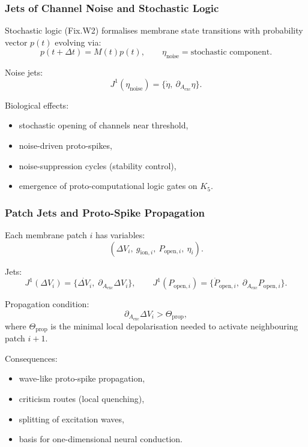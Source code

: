 \subsubsection{Jets of Channel Noise and Stochastic Logic}

Stochastic logic (Fix.W2) formalises membrane state transitions with
probability vector $p(t)$ evolving via:
\[
p(t+\Delta t)=M(t)p(t),\qquad
\eta_{\mathrm{noise}}=\text{stochastic component}.
\]

Noise jets:
\[
J^1(\eta_{\mathrm{noise}})=
\{\dot{\eta},\ \partial_{A_{\mathrm{exc}}}\eta\}.
\]

Biological effects:

\begin{itemize}
    \item stochastic opening of channels near threshold,
    \item noise-driven proto-spikes,
    \item noise-suppression cycles (stability control),
    \item emergence of proto-computational logic gates on $K_5$.
\end{itemize}


\subsubsection{Patch Jets and Proto-Spike Propagation}

Each membrane patch $i$ has variables:
\[
(\Delta V_i,\ g_{\mathrm{ion},i},\ P_{\mathrm{open},i},\ \eta_i).
\]

Jets:
\[
J^1(\Delta V_i)=\{\dot{\Delta V_i},\;\partial_{A_{\mathrm{exc}}}\Delta V_i\},
\qquad
J^1(P_{\mathrm{open},i})=\{\dot{P}_{\mathrm{open},i},\;
\partial_{A_{\mathrm{exc}}}P_{\mathrm{open},i}\}.
\]

Propagation condition:
\[
\partial_{A_{\mathrm{exc}}}\Delta V_{i} > \Theta_{\mathrm{prop}},
\]
where $\Theta_{\mathrm{prop}}$ is the minimal local depolarisation needed
to activate neighbouring patch $i+1$.

Consequences:

\begin{itemize}
    \item wave-like proto-spike propagation,
    \item criticism routes (local quenching),
    \item splitting of excitation waves,
    \item basis for one-dimensional neural conduction.
\end{itemize}


